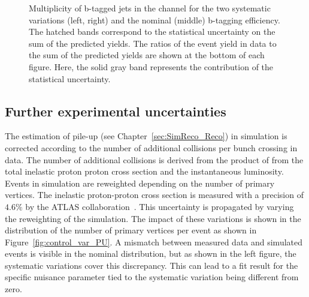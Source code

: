 \begin{figure}[htbp!]
\begin{center}
\caption{Multiplicity of b-tagged jets in the \emu channel for the two systematic variations (left, right) and the nominal (middle) b-tagging efficiency.
The hatched bands correspond to the statistical uncertainty on the sum of the predicted yields. 
        The ratios of the event yield in data to the sum of the predicted yields are
        shown at the bottom of each figure. Here, the solid gray band
        represents the contribution of the statistical uncertainty.
  \label{fig:control_var_BTAGH}}
  \end{center}
\end{figure}


\subsection{Further experimental uncertainties}

The estimation of pile-up (see Chapter~\ref{sec:SimReco_Reco}) in simulation is corrected according to the number of additional collisions per bunch crossing in data. The number of additional collisions is derived from the product of from the total inelastic proton proton cross section and the instantaneous luminosity.  
Events in simulation are reweighted depending on the number of primary vertices. 
The inelastic proton-proton cross section is measured with a precision of $4.6\%$ by the ATLAS collaboration~\cite{Aaboud:2016mmw}. 
This uncertainty is propagated by varying the reweighting of the simulation.
The impact of these variations is shown in the distribution of the number of primary vertices per event as shown in Figure~\ref{fig:control_var_PU}.
A mismatch between measured data and simulated events is visible in the nominal distribution, but as shown in the left figure, the systematic variations cover this discrepancy.
This can lead to a fit result for the specific nuisance parameter tied to the systematic variation being different from zero.

